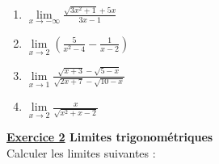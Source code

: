 \documentclass[12pt,a4paper]{article}
\begin{document}
\begin{multicols}{3}
\begin{enumerate}[align=left]
    \item $\displaystyle \lim\limits_{x \to -\infty} \frac{\sqrt{3x^2 + 1} + 5x}{3x - 1}$
    \item $\displaystyle \lim\limits_{x \to 2} \left( \frac{5}{x^2 - 4} - \frac{1}{x - 2} \right)$
    \item $\displaystyle \lim\limits_{x \to 1} \frac{\sqrt{x + 3} - \sqrt{5 - x}}{\sqrt{2x + 7} - \sqrt{10 - x}}$
    \item $\displaystyle \lim\limits_{x \to 2} \frac{x}{\sqrt{x^2 + x - 2}}$
\end{enumerate}
\end{multicols}

\textbf{\underline{Exercice 2} \quad Limites trigonométriques} \\
Calculer les limites suivantes :
\end{document}
